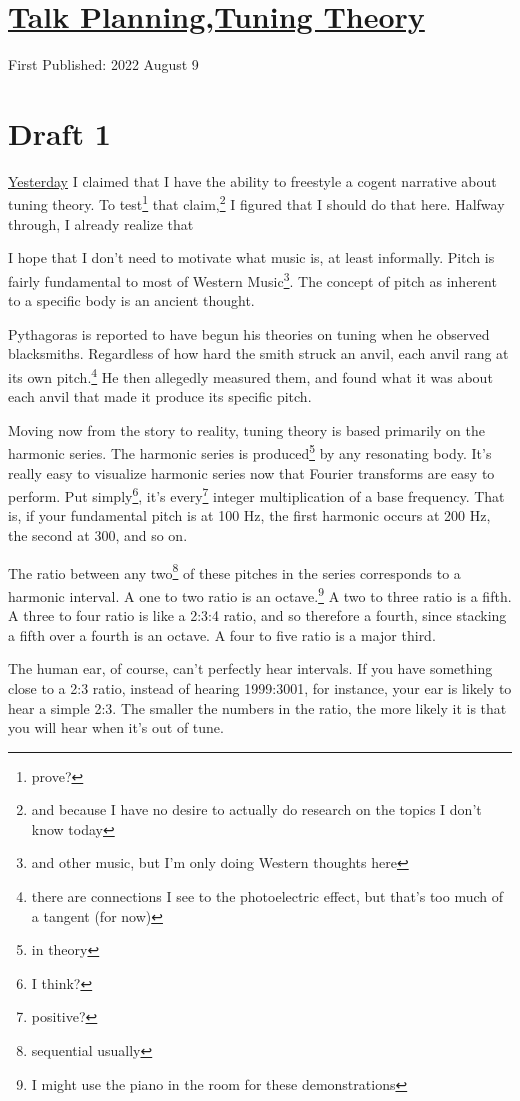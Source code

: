 \documentclass[12pt]{article}[titlepage]
\newcommand{\1}{\={a}}
\newcommand{\2}{\={e}}
\newcommand{\3}{\={\i}}
\newcommand{\4}{\=o}
\newcommand{\5}{\=u}
\newcommand{\6}{\={A}}
\renewcommand{\,}{\textsuperscript{,}}
\begin{document}
\doublespacing
\section{\href{talk-planning-2.html}{Talk Planning,Tuning Theory}}
First Published: 2022 August 9
\section{Draft 1}
\href{talk-planning-1.html}{Yesterday} I claimed that I have the ability to freestyle a cogent narrative about tuning theory.
To test\footnote{prove?} that claim,\footnote{and because I have no desire to actually do research on the topics I don't know today} I figured that I should do that here.
Halfway through, I already realize that 

I hope that I don't need to motivate what music is, at least informally.
Pitch is fairly fundamental to most of Western Music\footnote{and other music, but I'm only doing Western thoughts here}.
The concept of pitch as inherent to a specific body is an ancient thought.

Pythagoras is reported to have begun his theories on tuning when he observed blacksmiths.
Regardless of how hard the smith struck an anvil, each anvil rang at its own pitch.\footnote{there are connections I see to the photoelectric effect, but that's too much of a tangent (for now)}
He then allegedly measured them, and found what it was about each anvil that made it produce its specific pitch.

Moving now from the story to reality, tuning theory is based primarily on the harmonic series.
The harmonic series is produced\footnote{in theory} by any resonating body.
It's really easy to visualize harmonic series now that Fourier transforms are easy to perform.
Put simply\footnote{I think?}, it's every\footnote{positive?} integer multiplication of a base frequency.
That is, if your fundamental pitch is at 100 Hz, the first harmonic occurs at 200 Hz, the second at 300, and so on.

The ratio between any two\footnote{sequential usually} of these pitches in the series corresponds to a harmonic interval.
A one to two ratio is an octave.\footnote{I might use the piano in the room for these demonstrations}
A two to three ratio is a fifth.
A three to four ratio is like a 2:3:4 ratio, and so therefore a fourth, since stacking a fifth over a fourth is an octave.
A four to five ratio is a major third.

The human ear, of course, can't perfectly hear intervals.
If you have something close to a 2:3 ratio, instead of hearing 1999:3001, for instance, your ear is likely to hear a simple 2:3.
The smaller the numbers in the ratio, the more likely it is that you will hear when it's out of tune.
\end{document}
